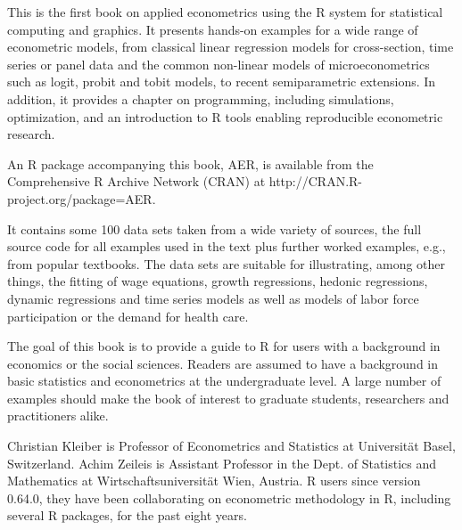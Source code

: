 
This is the first book on applied econometrics using the R system for statistical computing and graphics. It presents hands-on examples for a wide range of econometric models, from classical linear regression models for cross-section, time series or panel data and the common non-linear models of microeconometrics such as logit, probit and tobit models, to recent semiparametric extensions. In addition, it provides a chapter on programming, including simulations, optimization, and an introduction to R tools enabling reproducible econometric research.
 
An R package accompanying this book, AER, is available from the Comprehensive R Archive Network (CRAN) at http://CRAN.R-project.org/package=AER.
 
It contains some 100 data sets taken from a wide variety of sources, the full source code for all examples used in the text plus further worked examples, e.g., from popular textbooks. The data sets are suitable for illustrating, among other things, the fitting of wage equations, growth regressions, hedonic regressions, dynamic regressions and time series models as well as models of labor force participation or the demand for health care.
 
The goal of this book is to provide a guide to R for users with a background in economics or the social sciences. Readers are assumed to have a background in basic statistics and econometrics at the undergraduate level. A large number of examples should make the book of interest to graduate students, researchers and practitioners alike.
 
Christian Kleiber is Professor of Econometrics and Statistics at Universität Basel, Switzerland. Achim Zeileis is Assistant Professor in the Dept. of Statistics and Mathematics at Wirtschaftsuniversität Wien, Austria. R users since version 0.64.0, they have been collaborating on econometric methodology in R, including several R packages, for the past eight years.
